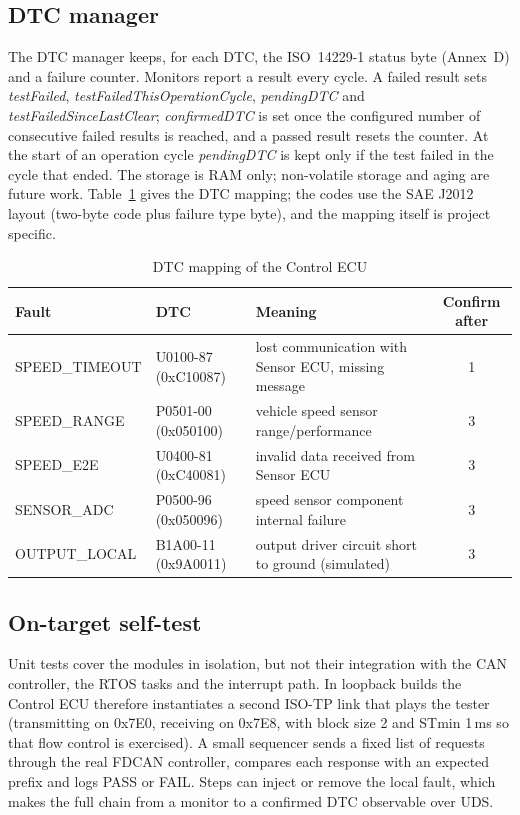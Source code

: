 \subsection{DTC manager}

The DTC manager keeps, for each DTC, the ISO~14229-1 status byte (Annex~D) and a failure counter. Monitors report a result every cycle. A failed result sets \textit{testFailed}, \textit{testFailedThisOperationCycle}, \textit{pendingDTC} and \textit{testFailedSinceLastClear}; \textit{confirmedDTC} is set once the configured number of consecutive failed results is reached, and a passed result resets the counter. At the start of an operation cycle \textit{pendingDTC} is kept only if the test failed in the cycle that ended. The storage is RAM only; non-volatile storage and aging are future work. Table~\ref{tab:dtcs} gives the DTC mapping; the codes use the SAE J2012 layout (two-byte code plus failure type byte), and the mapping itself is project specific.

\begin{table}[H]
\centering
\small
\caption{DTC mapping of the Control ECU}
\label{tab:dtcs}
\begin{tabularx}{\textwidth}{@{}llXc@{}}
\toprule
\textbf{Fault} & \textbf{DTC} & \textbf{Meaning} & \textbf{Confirm after} \\
\midrule
SPEED\_TIMEOUT & U0100-87 (0xC10087) & lost communication with Sensor ECU, missing message & 1 \\
SPEED\_RANGE & P0501-00 (0x050100) & vehicle speed sensor range/performance & 3 \\
SPEED\_E2E & U0400-81 (0xC40081) & invalid data received from Sensor ECU & 3 \\
SENSOR\_ADC & P0500-96 (0x050096) & speed sensor component internal failure & 3 \\
OUTPUT\_LOCAL & B1A00-11 (0x9A0011) & output driver circuit short to ground (simulated) & 3 \\
\bottomrule
\end{tabularx}
\end{table}

\subsection{On-target self-test}

Unit tests cover the modules in isolation, but not their integration with the CAN controller, the RTOS tasks and the interrupt path. In loopback builds the Control ECU therefore instantiates a second ISO-TP link that plays the tester (transmitting on 0x7E0, receiving on 0x7E8, with block size 2 and STmin 1\,ms so that flow control is exercised). A small sequencer sends a fixed list of requests through the real FDCAN controller, compares each response with an expected prefix and logs PASS or FAIL. Steps can inject or remove the local fault, which makes the full chain from a monitor to a confirmed DTC observable over UDS.

